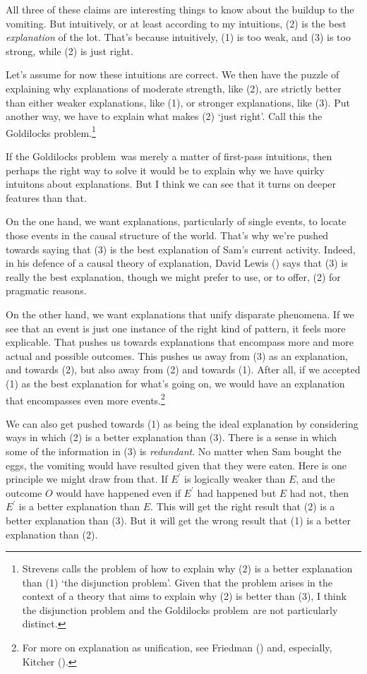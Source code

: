 \documentclass[
  10pt,
  letterpaper,
  DIV=11,
  numbers=noendperiod,
  twoside]{scrartcl}
\begin{document}
All three of these claims are interesting things to know about the
buildup to the vomiting. But intuitively, or at least according to my
intuitions, (2) is the best \emph{explanation} of the lot. That's
because intuitively, (1) is too weak, and (3) is too strong, while (2)
is just right.

Let's assume for now these intuitions are correct. We then have the
puzzle of explaining why explanations of moderate strength, like (2),
are strictly better than either weaker explanations, like (1), or
stronger explanations, like (3). Put another way, we have to explain
what makes (2) `just right'. Call this the Goldilocks
problem.\footnote{Strevens calls the problem of how to explain why (2)
  is a better explanation than (1) `the disjunction problem'. Given that
  the problem arises in the context of a theory that aims to explain why
  (2) is better than (3), I think the disjunction problem and the
  Goldilocks problem~are not particularly distinct.}

If the Goldilocks problem~was merely a matter of first-pass intuitions,
then perhaps the right way to solve it would be to explain why we have
quirky intuitons about explanations. But I think we can see that it
turns on deeper features than that.

On the one hand, we want explanations, particularly of single events, to
locate those events in the causal structure of the world. That's why
we're pushed towards saying that (3) is the best explanation of Sam's
current activity. Indeed, in his defence of a causal theory of
explanation, David Lewis () says that (3)
is really the best explanation, though we might prefer to use, or to
offer, (2) for pragmatic reasons.

On the other hand, we want explanations that unify disparate phenomena.
If we see that an event is just one instance of the right kind of
pattern, it feels more explicable. That pushes us towards explanations
that encompass more and more actual and possible outcomes. This pushes
us away from (3) as an explanation, and towards (2), but also away from
(2) and towards (1). After all, if we accepted (1) as the best
explanation for what's going on, we would have an explanation that
encompasses even more events.\footnote{For more on explanation as
  unification, see Friedman () and,
  especially, Kitcher ().}

We can also get pushed towards (1) as being the ideal explanation by
considering ways in which (2) is a better explanation than (3). There is
a sense in which some of the information in (3) is \emph{redundant}. No
matter when Sam bought the eggs, the vomiting would have resulted given
that they were eaten. Here is one principle we might draw from that. If
\(E^\prime\) is logically weaker than \(E\), and the outcome \(O\) would
have happened even if \(E^\prime\) had happened but \(E\) had not, then
\(E^\prime\) is a better explanation than \(E\). This will get the right
result that (2) is a better explanation than (3). But it will get the
wrong result that (1) is a better explanation than (2).
\end{document}
